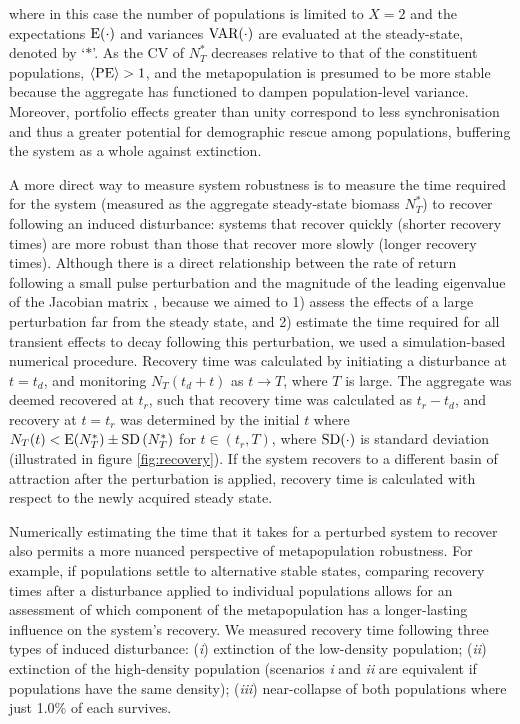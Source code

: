 \documentclass{revtex4}
\begin{document}
\noindent where in this case the number of populations is limited to $X=2$ and the expectations $\rm E(\cdot)$ and variances $\rm VAR(\cdot)$ are evaluated at the steady-state, denoted by `$*$'.
As the CV of $N_T^*$ decreases relative to that of the constituent populations, $\langle{\rm PE}\rangle > 1$, and the metapopulation is presumed to be more stable because the aggregate has functioned to dampen population-level variance.
Moreover, portfolio effects greater than unity correspond to less synchronisation  \citep{Loreau:2008ju,Anderson:2014cx,Yeakel:2013vz} and thus a greater potential for demographic rescue among populations, buffering the system as a whole against extinction. 

A more direct way to measure system robustness is to measure the time required for the system (measured as the aggregate steady-state biomass $N_T^*$) to recover following an induced disturbance: systems that recover quickly (shorter recovery times) are more robust than those that recover more slowly (longer recovery times).
Although there is a direct relationship between the rate of return following a small pulse perturbation and the magnitude of the leading eigenvalue of the Jacobian matrix \citep{GuckHolmes}, because we aimed to 
1) assess the effects of a large perturbation far from the steady state, and 
2) estimate the time required for all transient effects to decay following this perturbation, we used a simulation-based numerical procedure.
Recovery time was calculated by initiating a disturbance at $t=t_d$, and monitoring $N_T(t_d+t)$ as $t\rightarrow T$, where $T$ is large. 
The aggregate was deemed recovered at $t_r$, such that recovery time was calculated as $t_r-t_d$, and recovery at $t=t_r$ was determined by the initial $t$ where $N_T(t) < {\rm E}(N_T^*)\pm{\rm SD}\left( N_T^* \right)$ for $t\in(t_r,T)$, where $\rm{SD}(\cdot)$ is standard deviation (illustrated in figure \ref{fig:recovery}).
If the system recovers to a different basin of attraction after the perturbation is applied, recovery time is calculated with respect to the newly acquired steady state.

Numerically estimating the time that it takes for a perturbed system to recover also permits a more nuanced perspective of metapopulation robustness.
For example, if populations settle to alternative stable states, comparing recovery times after a disturbance applied to individual populations allows for an assessment of which component of the metapopulation has a longer-lasting influence on the system's recovery.
We measured recovery time following three types of induced disturbance: (\emph{i}) extinction of the low-density population; (\emph{ii}) extinction of the high-density population (scenarios \emph{i} and \emph{ii} are equivalent if populations have the same density); (\emph{iii}) near-collapse of both populations where just 1.0\% of each survives.
\\
\end{document}
